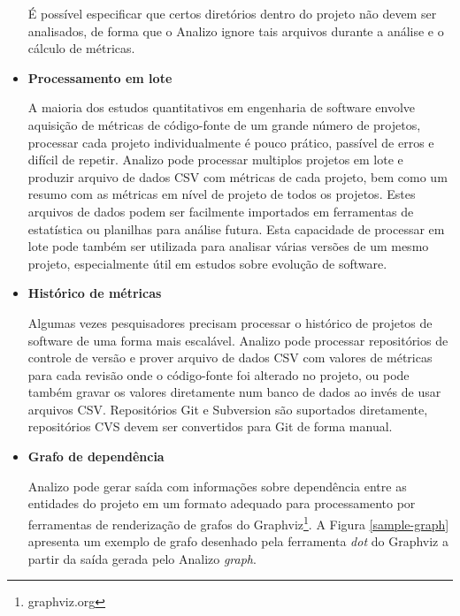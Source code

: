 \begin{itemize}
\begin{itemize}
\end{itemize}

É possível especificar que certos diretórios dentro do projeto não devem ser
analisados, de forma que o Analizo ignore tais arquivos durante a análise e o
cálculo de métricas.

\item {\bf Processamento em lote}\label{lote}

A maioria dos estudos quantitativos em engenharia de software envolve aquisição
de métricas de código-fonte de um grande número de projetos, processar cada
projeto individualmente é pouco prático, passível de erros e difícil de
repetir. Analizo pode processar multiplos projetos em lote e produzir arquivo
de dados CSV com métricas de cada projeto, bem como um resumo com as métricas
em nível de projeto de todos os projetos. Estes arquivos de dados podem ser
facilmente importados em ferramentas de estatística ou planilhas para análise
futura. Esta capacidade de processar em lote pode também ser utilizada para
analisar várias versões de um mesmo projeto, especialmente útil em estudos
sobre evolução de software.


\item {\bf Histórico de métricas}

Algumas vezes pesquisadores precisam processar o histórico de projetos de
software de uma forma mais escalável. Analizo pode processar repositórios de
controle de versão e prover arquivo de dados CSV com valores de métricas para
cada revisão onde o código-fonte foi alterado no projeto, ou pode também gravar
os valores diretamente num banco de dados ao invés de usar arquivos CSV. Repositórios Git e
Subversion são suportados diretamente, repositórios CVS devem ser convertidos
para Git de forma manual.

\item {\bf Grafo de dependência}

Analizo pode gerar saída com informações sobre dependência entre as entidades
do projeto em um formato adequado para processamento por ferramentas de
renderização de grafos do Graphviz\footnote{graphviz.org}. A Figura
\ref{sample-graph} apresenta um exemplo de grafo desenhado pela ferramenta {\it
dot} do Graphviz a partir da saída gerada pelo Analizo {\it graph}.


\end{itemize}
